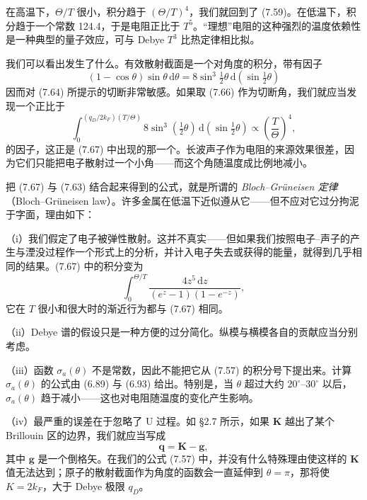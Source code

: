 在高温下，$\Theta/T$ 很小，积分趋于 $(\Theta/T)^{4}$，我们就回到了 (7.59)。在低温下，积分趋于一个常数 124.4，于是电阻正比于 $T^{5}$。“理想”电阻的这种强烈的温度依赖性是一种典型的量子效应，可与 Debye $T^{3}$ 比热定律相比拟。

我们可以看出发生了什么。有效散射截面是一个对角度的积分，带有因子
\begin{equation*}
(1-\cos\theta)\sin\theta\,\mathrm{d}\theta=8\sin^{3}\tfrac{1}{2}\theta\,\mathrm{d}(\sin\tfrac{1}{2}\theta)\tag{7.69}
\end{equation*}
因而对 (7.64) 所提示的切断非常敏感。如果取 (7.66) 作为切断角，我们就应当发现一个正比于
\begin{equation*}
\int_{0}^{(q_{D}/2k_{F})(T/\Theta)}8\sin^{3}(\tfrac{1}{2}\theta)\,\mathrm{d}(\sin\tfrac{1}{2}\theta)\propto\left(\frac{T}{\Theta}\right)^{4},\tag{7.70}
\end{equation*}
的因子，这正是 (7.67) 中出现的那一个。长波声子作为电阻的来源效果很差，因为它们只能把电子散射过一个小角——而这个角随温度成比例地减小。

把 (7.67) 与 (7.63) 结合起来得到的公式，就是所谓的 \emph{Bloch--Grüneisen 定律}（Bloch--Grüneisen law）。许多金属在低温下近似遵从它——但不应对它过分拘泥于字面，理由如下：

（i）我们假定了电子被弹性散射。这并不真实——但如果我们按照电子--声子的产生与湮没过程作一个形式上的分析，并计入电子失去或获得的能量，就得到几乎相同的结果。(7.67) 中的积分变为
\begin{equation*}
\int_{0}^{\Theta/T}\frac{4z^{5}\,\mathrm{d}z}{(e^{z}-1)(1-e^{-z})},
\end{equation*}
它在 $T$ 很小和很大时的渐近行为都与 (7.67) 相同。

（ii）Debye 谱的假设只是一种方便的过分简化。纵模与横模各自的贡献应当分别考虑。

（iii）函数 $\sigma_{a}(\theta)$ 不是常数，因此不能把它从 (7.57) 的积分号下提出来。计算 $\sigma_{a}(\theta)$ 的公式由 (6.89) 与 (6.93) 给出。特别是，当 $\theta$ 超过大约 $20^{\circ}$--$30^{\circ}$ 以后，$\sigma_{a}(\theta)$ 趋于减小——这也对电阻随温度的变化产生影响。

（iv）最严重的误差在于忽略了 U 过程。如 §2.7 所示，如果 $\mathbf{K}$ 越出了某个 Brillouin 区的边界，我们就应当写成
\begin{equation*}
\mathbf{q}=\mathbf{K}-\mathbf{g},\tag{7.71}
\end{equation*}
其中 $\mathbf{g}$ 是一个倒格矢。在我们的公式 (7.57) 中，并没有什么特殊理由使这样的 $\mathbf{K}$ 值无法达到；原子的散射截面作为角度的函数会一直延伸到 $\theta=\pi$，那将使 $K=2k_{F}$，大于 Debye 极限 $q_{D}$。


